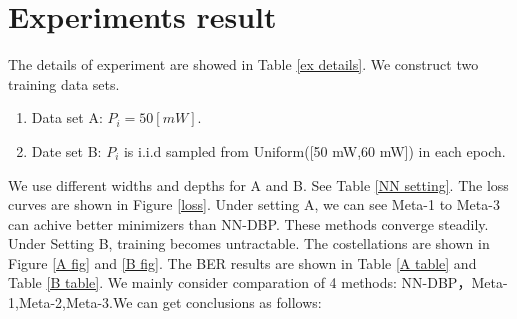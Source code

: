 \section{Experiments result}
The details of experiment are showed in Table \ref{ex details}. We construct two training data sets.
\begin{enumerate}
  \item Data set A: $P_i = 50 [mW]$.
  \item Date set B: $P_i$ is i.i.d sampled from Uniform([50 mW,60 mW]) in each epoch.
\end{enumerate}
We use different widths and depths for A and B. See Table \ref{NN setting}. The loss curves are shown
in Figure \ref{loss}. Under setting A, we can see Meta-1 to Meta-3 can achive
better minimizers than NN-DBP. These methods converge steadily. Under Setting B, training becomes untractable.
The costellations are shown in Figure \ref{A fig} and \ref{B fig}. The BER results are shown in Table \ref{A table} and Table \ref{B table}.
We mainly consider comparation of 4 methods: NN-DBP，Meta-1,Meta-2,Meta-3.We can get conclusions as follows:
